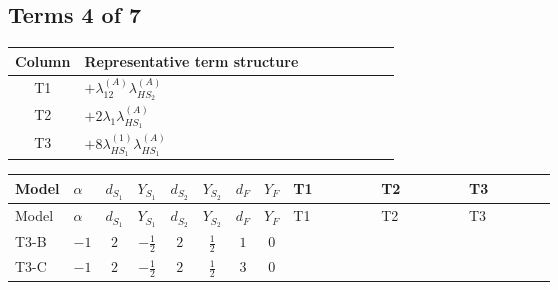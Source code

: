 \documentclass[8pt]{article}
\begin{document}
\begin{landscape}
\subsection*{Terms 4 of 7}
\begin{center}
\begin{tabular}{@{}c >{\raggedright\arraybackslash}p{0.82\linewidth}@{}}
\toprule
Column & Representative term structure \\
\midrule
T1 & \(\displaystyle +{\lambda_{12}^{(A)}} {\lambda_{HS_2}^{(A)}}\) \\
\midrule
T2 & \(\displaystyle +2 {\lambda_1} {\lambda_{HS_1}^{(A)}}\) \\
\midrule
T3 & \(\displaystyle +8 {\lambda_{HS_1}^{(1)}} {\lambda_{HS_1}^{(A)}}\) \\
\midrule
\bottomrule
\end{tabular}
\end{center}
\smallskip
\tiny
\begin{longtable}{@{}llcccccc >{\raggedright\arraybackslash}p{0.21\linewidth} >{\raggedright\arraybackslash}p{0.21\linewidth} >{\raggedright\arraybackslash}p{0.21\linewidth}@{}}
\toprule
Model & $\alpha$ & $d_{S_1}$ & $Y_{S_1}$ & $d_{S_2}$ & $Y_{S_2}$ & $d_F$ & $Y_F$ & T1 & T2 & T3 \\
\midrule
\endfirsthead
\toprule
Model & $\alpha$ & $d_{S_1}$ & $Y_{S_1}$ & $d_{S_2}$ & $Y_{S_2}$ & $d_F$ & $Y_F$ & T1 & T2 & T3 \\
\midrule
\endhead
T3-B & $-1$ & $2$ & $-\frac{1}{2}$ & $2$ & $\frac{1}{2}$ & $1$ & $0$ & \scriptsize\adjustbox{max width=\linewidth}{$\begin{gathered} +{\lambda_{12}^{(A)}} {\lambda_{HS_2}^{(A)}}\end{gathered}$} & \scriptsize\adjustbox{max width=\linewidth}{$\begin{gathered} +2 {\lambda_1} {\lambda_{HS_1}^{(A)}}\end{gathered}$} & \scriptsize\adjustbox{max width=\linewidth}{$\begin{gathered} +8 {\lambda_{HS_1}^{(1)}} {\lambda_{HS_1}^{(A)}}\end{gathered}$} \\
\midrule
T3-C & $-1$ & $2$ & $-\frac{1}{2}$ & $2$ & $\frac{1}{2}$ & $3$ & $0$ & \scriptsize\adjustbox{max width=\linewidth}{$\begin{gathered} +{\lambda_{12}^{(A)}} {\lambda_{HS_2}^{(A)}}\end{gathered}$} & \scriptsize\adjustbox{max width=\linewidth}{$\begin{gathered} +2 {\lambda_1} {\lambda_{HS_1}^{(A)}}\end{gathered}$} & \scriptsize\adjustbox{max width=\linewidth}{$\begin{gathered} +8 {\lambda_{HS_1}^{(1)}} {\lambda_{HS_1}^{(A)}}\end{gathered}$} \\

\end{longtable}
\end{landscape}
\end{document}
